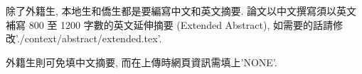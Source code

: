 \StartAbstractChi

除了外籍生, 本地生和僑生都是要編寫中文和英文摘要. 論文以中文撰寫須以英文補寫 800 至 1200 字數的英文延伸摘要 (Extended Abstract), 如需要的話請修改'./context/abstract/extended.tex'.

外籍生則可免填中文摘要, 而在上傳時網頁資訊需填上'NONE'.

\EndAbstractChi
